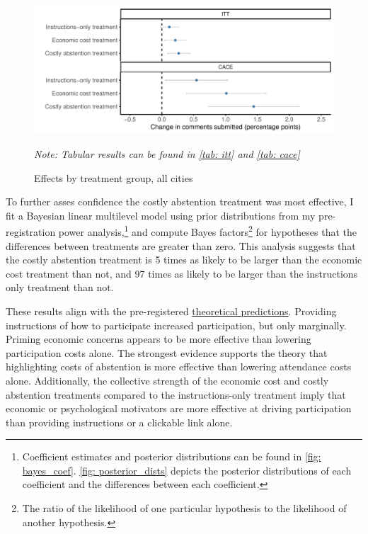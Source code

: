 \documentclass[12pt,final,fleqn]{article}
\theoremstyle{plain}
\begin{document}
\begin{figure}[H]
\includegraphics[width = \textwidth]{../figs/fg3.pdf}
\caption{Effects by treatment group, all cities}
\vspace{-0.5cm}
{\small \textit{Note: Tabular results can be found in \autoref{tab: itt} and \autoref{tab: cace}}}
\label{fig: all_treatments}
\end{figure}

To further asses confidence the costly abstention treatment was most effective, I fit a Bayesian linear multilevel model using prior distributions from my pre-registration power analysis,\footnote{Coefficient estimates and posterior distributions can be found in \autoref{fig: bayes_coef}. \autoref{fig: posterior_dists} depicts the posterior distributions of each coefficient and the differences between each coefficient.} and compute Bayes factors\footnote{The ratio of the likelihood of one particular hypothesis to the likelihood of another hypothesis.} for hypotheses that the differences between treatments are greater than zero. This analysis suggests that the costly abstention treatment is 5 times as likely to be larger than the economic cost treatment than not, and 97 times as likely to be larger than the instructions only treatment than not. 

These results align with the pre-registered \hyperref[theory: treatments]{theoretical predictions}. Providing instructions of how to participate increased participation, but only marginally. Priming economic concerns appears to be more effective than lowering participation costs alone. The strongest evidence supports the theory that highlighting costs of abstention is more effective than lowering attendance costs alone. Additionally, the collective strength of the economic cost and costly abstention treatments compared to the instructions-only treatment imply that economic or psychological motivators are more effective at driving participation than providing instructions or a clickable link alone. 
\end{document}
